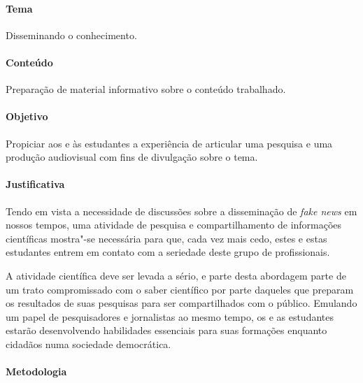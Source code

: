 \documentclass[11pt]{extarticle}
\begin{document}
\paragraph{Tema} Disseminando o conhecimento.

\paragraph{Conteúdo} Preparação de material informativo sobre o conteúdo trabalhado.

\paragraph{Objetivo} Propiciar aos e às estudantes a experiência de articular
uma pesquisa e uma produção audiovisual com fins de divulgação sobre o tema.

\paragraph{Justificativa} Tendo em vista a necessidade de discussões sobre
a disseminação de \textit{fake news} em nossos tempos, uma atividade de pesquisa
e compartilhamento de informações científicas mostra"-se necessária para que,
cada vez mais cedo, estes e estas estudantes entrem em contato com a seriedade
deste grupo de profissionais. 

A atividade científica deve ser levada a sério,
e parte desta abordagem parte de um trato compromissado com o saber científico
por parte daqueles que preparam os resultados de suas pesquisas para
ser compartilhados com o público. Emulando um papel de pesquisadores
e jornalistas ao mesmo tempo, os e as estudantes estarão desenvolvendo
habilidades essenciais para suas formações enquanto cidadãos numa sociedade
democrática. 

\paragraph{Metodologia} 
\end{document}
